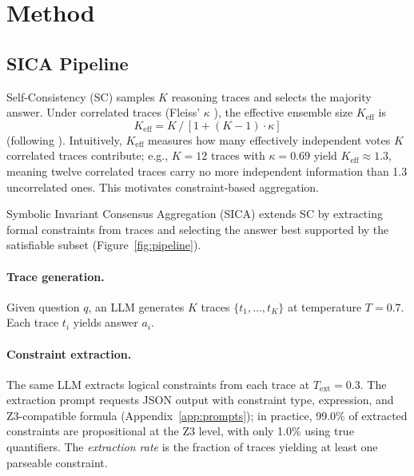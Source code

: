 \section{Method}
\label{sec:method}

\subsection{SICA Pipeline}
\label{sec:pipeline}
\label{sec:condorcet}
\label{sec:effective-k}

Self-Consistency (SC) \citep{wang2023sc} samples $K$ reasoning traces and selects the majority answer. Under correlated traces (Fleiss' $\kappa$ \citep{fleiss1971kappa}), the effective ensemble size $K_\text{eff}$ is
\begin{equation}
\label{eq:effk}
K_{\text{eff}} = K \,/\, [1 + (K{-}1) \cdot \kappa]
\end{equation}
(following \citet{ladha1992correlated}). Intuitively, $K_\text{eff}$ measures how many effectively independent votes $K$ correlated traces contribute; e.g., $K{=}12$ traces with $\kappa{=}0.69$ yield $K_\text{eff} \approx 1.3$, meaning twelve correlated traces carry no more independent information than 1.3 uncorrelated ones. This motivates constraint-based aggregation.

Symbolic Invariant Consensus Aggregation (SICA) extends SC by extracting formal constraints from traces and selecting the answer best supported by the satisfiable subset (Figure~\ref{fig:pipeline}).

\paragraph{Trace generation.} Given question $q$, an LLM generates $K$ traces $\{t_1, \ldots, t_K\}$ at temperature $T = 0.7$. Each trace $t_i$ yields answer $a_i$.

\paragraph{Constraint extraction.}\label{sec:constraint-extraction} The same LLM extracts logical constraints from each trace at $T_{\text{ext}} = 0.3$. The extraction prompt requests JSON output with constraint type, expression, and Z3-compatible formula (Appendix~\ref{app:prompts}); in practice, 99.0\% of extracted constraints are propositional at the Z3 level, with only 1.0\% using true quantifiers. The \emph{extraction rate} is the fraction of traces yielding at least one parseable constraint.

